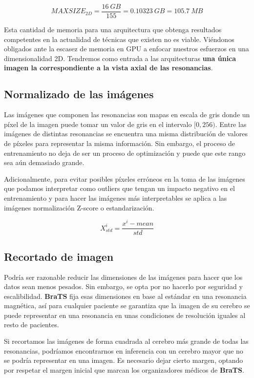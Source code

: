 $$ MAXSIZE_{2D} = \frac{16\ GB}{155}  = 0.10323\ GB = 105.7\ MB $$  

Esta cantidad de memoria para una arquitectura que obtenga resultados competentes en la actualidad de técnicas que existen no es viable. Viéndonos obligados ante la escasez de memoria en GPU a enfocar nuestros esfuerzos en una dimensionalidad 2D. Tendremos como entrada a las arquitecturas \textbf{una única imagen la correspondiente a la vista axial de las resonancias}.

\subsection{Normalizado de las imágenes}

Las imágenes que componen las resonancias son mapas en escala de gris donde un píxel de la imagen puede tomar un valor de gris en el intervalo $[0, 256)$. Entre las imágenes de distintas resonancias se encuentra una misma distribución de valores de píxeles para representar la misma información. Sin embargo, el proceso de entrenamiento no deja de ser un proceso de optimización y puede que este rango sea aún demasiado grande.

Adicionalmente, para evitar posibles píxeles erróneos en la toma de las imágenes que podamos interpretar como outliers que tengan un impacto negativo en el entrenamiento y para hacer las imágenes más interpretables se aplica a las imágenes normalización Z-score o estandarización.

$$ X_{std}^{i}= \frac{x^{i}-mean}{std} $$



\subsection{Recortado de imagen}

Podría ser razonable reducir las dimensiones de las imágenes para hacer que los datos sean menos pesados. Sin embargo, se opta por no hacerlo por seguridad y escalibilidad. \textbf{BraTS} fija esas dimensiones en base al estándar en una resonancia magnética, así para cualquier paciente se garantiza que la imagen de su cerebro se puede representar en una resonancia en unas condiciones de resolución iguales al resto de pacientes.

Si recortamos las imágenes de forma cuadrada al cerebro más grande de todas las resonancias, podríamos encontrarnos en inferencia con un cerebro mayor que no se podría representar en una imagen. Es necesario dejar cierto margen, optando por respetar el margen inicial que marcan los organizadores médicos de \textbf{BraTS}.

